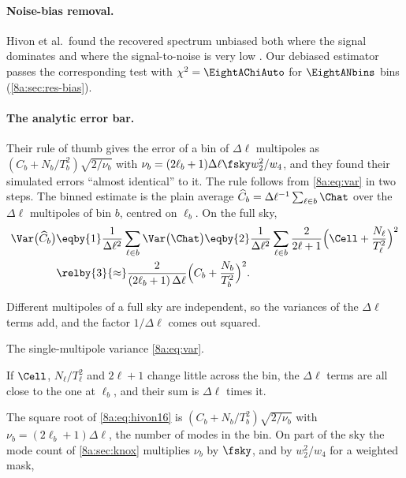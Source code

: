 \paragraph{Noise-bias removal.}
Hivon et al.\ found the recovered spectrum unbiased both where the signal dominates and
where the signal-to-noise is very low . Our debiased estimator passes
the corresponding test with $\chi^2=\EightAChiAuto$ for $\EightANbins$ bins
(\cref{8a:sec:res-bias}).

\paragraph{The analytic error bar.}
Their rule of thumb  gives the error of a bin of $\Delta\ell$ multipoles as
$(C_b+N_b/T_b^2)\sqrt{2/\nu_b}$ with $\nu_b=(2\ell_b+1)\Delta\ell\fsky w_2^2/w_4$, and they found
their simulated errors ``almost identical'' to it. The rule follows from \eqref{8a:eq:var} in two steps. The binned estimate
is the plain average $\widehat C_b=\Delta\ell^{-1}\sum_{\ell\in b}\Chat$ over the $\Delta\ell$
multipoles of bin $b$, centred on $\ell_b$. On the full sky,
\begin{align}
  \Var\bigl(\widehat C_b\bigr)
  &\eqby{1}\frac{1}{\Delta\ell^2}\sum_{\ell\in b}\Var\bigl(\Chat\bigr)
   \eqby{2}\frac{1}{\Delta\ell^2}\sum_{\ell\in b}\frac{2}{2\ell+1}\Bigl(\Cell+\frac{N_\ell}{T_\ell^2}\Bigr)^2
   \nonumber\\
  &\relby{3}{\approx}\frac{2}{(2\ell_b+1)\,\Delta\ell}\Bigl(C_b+\frac{N_b}{T_b^2}\Bigr)^2 .
  \label{8a:eq:hivon16}
\end{align}
\begin{explain}
  \item Different multipoles of a full sky are independent, so the variances of the $\Delta\ell$
        terms add, and the factor $1/\Delta\ell$ comes out squared.
  \item The single-multipole variance \eqref{8a:eq:var}.
  \item If $\Cell$, $N_\ell/T_\ell^2$ and $2\ell+1$ change little across the bin, the $\Delta\ell$
        terms are all close to the one at $\ell_b$, and their sum is $\Delta\ell$ times it.
\end{explain}
The square root of \eqref{8a:eq:hivon16} is $(C_b+N_b/T_b^2)\sqrt{2/\nu_b}$ with
$\nu_b=(2\ell_b+1)\Delta\ell$, the number of modes in the bin. On part of the sky the mode count
of \cref{8a:sec:knox} multiplies $\nu_b$ by $\fsky$, and by $w_2^2/w_4$ for a weighted mask,
